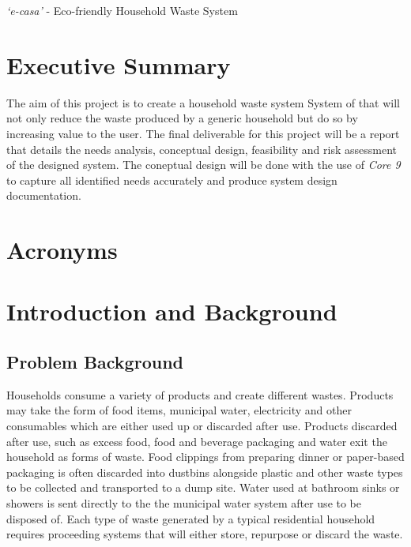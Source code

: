\documentclass[a4paper,11pt,fleqn]{report}
\begin{document}

\textit{`e-casa'} - Eco-friendly Household Waste System

\chapter*{Executive Summary}
The aim of this project is to create a household waste system System of that will not only reduce the waste produced by a generic household but do so by increasing value to the user. The final deliverable for this project will be a report that details the needs analysis, conceptual design, feasibility and risk assessment of the designed system. The coneptual design will be done with the use of \textit{Core 9} to capture all identified needs accurately and produce system design documentation.

\tableofcontents
\listoffigures{}
\listoftables{}

\chapter*{Acronyms}
\begin{acronym}[ABCDEF]
\end{acronym}

\chapter{Introduction and Background}
\setcounter{page}{1}
\acresetall

\section{Problem Background} \label{sec: Problem Background}
Households consume a variety of products and create different wastes. Products may take the form of food items, municipal water, electricity and other consumables which are either used up or discarded after use. Products discarded after use, such as excess food, food and beverage packaging and water exit the household as forms of waste.  Food clippings from preparing dinner or paper-based packaging is often discarded into dustbins alongside plastic and other waste types to be collected and transported to a dump site. Water used at bathroom sinks or showers is sent directly to the the municipal water system after use to be disposed of. Each type of waste generated by a typical residential household requires proceeding systems that will either store, repurpose or discard the waste.
  
\end{document}
